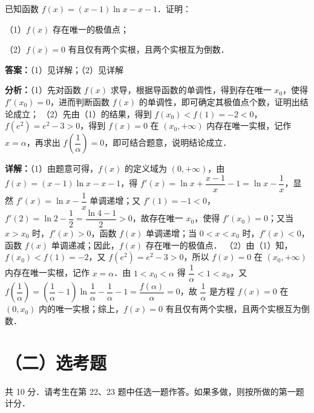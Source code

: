 \begin{question}[points=12]
已知函数 $f(x)=(x-1)\ln x-x-1$．证明：

（1）$f(x)$ 存在唯一的极值点；

（2）$f(x)=0$ 有且仅有两个实根，且两个实根互为倒数．
\begin{solution}
\textbf{答案：}（1）见详解；（2）见详解

\textbf{分析：}（1）先对函数 $f(x)$ 求导，根据导函数的单调性，得到存在唯一 $x_0$，使得 $f'(x_0)=0$，进而判断函数 $f(x)$ 的单调性，即可确定其极值点个数，证明出结论成立；
（2）先由（1）的结果，得到 $f(x_0)<f(1)=-2<0$，$f(e^2)=e^2-3>0$，得到 $f(x)=0$ 在 $(x_0,+\infty)$ 内存在唯一实根，记作 $x=\alpha$，再求出 $f\left(\dfrac{1}{\alpha}\right)=0$，即可结合题意，说明结论成立．

\textbf{详解：}（1）由题意可得，$f(x)$ 的定义域为 $(0,+\infty)$，由 $f(x)=(x-1)\ln x-x-1$，得 $f'(x)=\ln x+\dfrac{x-1}{x}-1=\ln x-\dfrac{1}{x}$，显然 $f'(x)=\ln x-\dfrac{1}{x}$ 单调递增；又 $f'(1)=-1<0$，$f'(2)=\ln2-\dfrac{1}{2}=\dfrac{\ln4-1}{2}>0$，故存在唯一 $x_0$，使得 $f'(x_0)=0$；又当 $x>x_0$ 时，$f'(x)>0$，函数 $f(x)$ 单调递增；当 $0<x<x_0$ 时，$f'(x)<0$，函数 $f(x)$ 单调递减；因此，$f(x)$ 存在唯一的极值点．
（2）由（1）知，$f(x_0)<f(1)=-2$，又 $f(e^2)=e^2-3>0$，所以 $f(x)=0$ 在 $(x_0,+\infty)$ 内存在唯一实根，记作 $x=\alpha$．由 $1<x_0<\alpha$ 得 $\dfrac{1}{\alpha}<1<x_0$，又 $f\left(\dfrac{1}{\alpha}\right)=\left(\dfrac{1}{\alpha}-1\right)\ln\dfrac{1}{\alpha}-\dfrac{1}{\alpha}-1=\dfrac{f(\alpha)}{\alpha}=0$，故 $\dfrac{1}{\alpha}$ 是方程 $f(x)=0$ 在 $(0,x_0)$ 内的唯一实根；综上，$f(x)=0$ 有且仅有两个实根，且两个实根互为倒数．
\end{solution}
\end{question}

\section*{（二）选考题}
共 10 分．请考生在第 22、23 题中任选一题作答。如果多做，则按所做的第一题计分．

